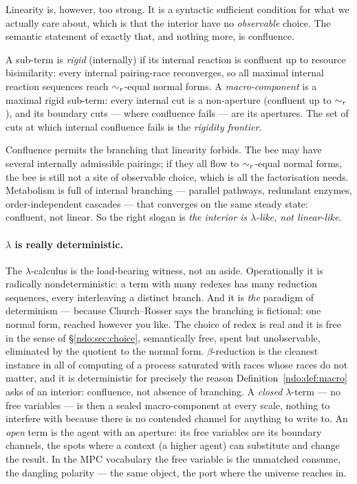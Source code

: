 Linearity is, however, too strong. It is a syntactic sufficient condition for what
we actually care about, which is that the interior have no \emph{observable} choice.
The semantic statement of exactly that, and nothing more, is confluence.

\begin{definition}\label{ndo:def:macro}
A sub-term is \emph{rigid} (internally) if its internal reaction is confluent up to
resource bisimilarity: every internal pairing-race reconverges, so all maximal
internal reaction sequences reach $\sim_{r}$-equal normal forms. A
\emph{macro-component} is a maximal rigid sub-term: every internal cut is a
non-aperture (confluent up to $\sim_{r}$), and its boundary cuts --- where
confluence fails --- are its apertures. The set of cuts at which internal
confluence fails is the \emph{rigidity frontier}.
\end{definition}

\noindent
Confluence permits the branching that linearity forbids. The bee may have several
internally admissible pairings; if they all flow to $\sim_{r}$-equal normal forms,
the bee is still not a site of observable choice, which is all the factorisation
needs. Metabolism is full of internal branching --- parallel pathways, redundant
enzymes, order-independent cascades --- that converges on the same steady state:
confluent, not linear. So the right slogan is \emph{the interior is
$\lambda$-like, not linear-like}.

\paragraph{$\lambda$ is really deterministic.}
The $\lambda$-calculus is the load-bearing witness, not an aside. Operationally it
is radically nondeterministic: a term with many redexes has many reduction
sequences, every interleaving a distinct branch. And it is \emph{the} paradigm of
determinism --- because Church--Rosser says the branching is fictional: one normal
form, reached however you like. The choice of redex is real and it is free in the
sense of \S\ref{ndo:sec:choice}, semantically free, spent but unobservable, eliminated
by the quotient to the normal form. $\beta$-reduction is the cleanest instance in
all of computing of a process saturated with races whose races do not matter, and
it is deterministic for precisely the reason Definition~\ref{ndo:def:macro} asks of an
interior: confluence, not absence of branching. A \emph{closed} $\lambda$-term ---
no free variables --- is then a sealed macro-component at every scale, nothing to
interfere with because there is no contended channel for anything to write to. An
\emph{open} term is the agent with an aperture: its free variables are its boundary
channels, the spots where a context (a higher agent) can substitute and change the
result. In the MPC vocabulary the free variable is the unmatched consume, the
dangling polarity --- the same object, the port where the universe reaches in.

